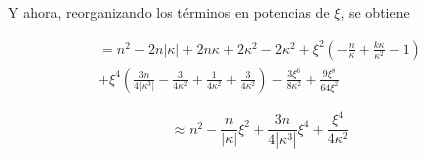 \documentclass[a4paper, 12pt]{article} %
\begin{document}
Y ahora, reorganizando los t\'erminos en potencias de  $\xi$, se obtiene

\[
\begin{split}
=n^2 -2n|\kappa| + 2n\kappa + 2\kappa^2 - 2\kappa^2 + \xi^2 \left(  -\frac{n}{\kappa} + \frac{k\kappa}{\kappa^2} -1 \right) \\
+ \xi^4 \left(  \frac{3n}{4|\kappa^3|} -\frac{3}{4\kappa^2} +\frac{1}{4\kappa^2} + \frac{3}{4\kappa^2}  \right)  -\frac{3\xi^6}{8\kappa^2} + \frac{9\xi^8}{64\xi^2}
\end{split}
\]

\[
\approx n^2 - \frac{n}{|\kappa|}\xi^2 +\frac{3n}{4|\kappa^3|}\xi^4 +\frac{\xi^4}{4\kappa^2}
\]








\end{document}
